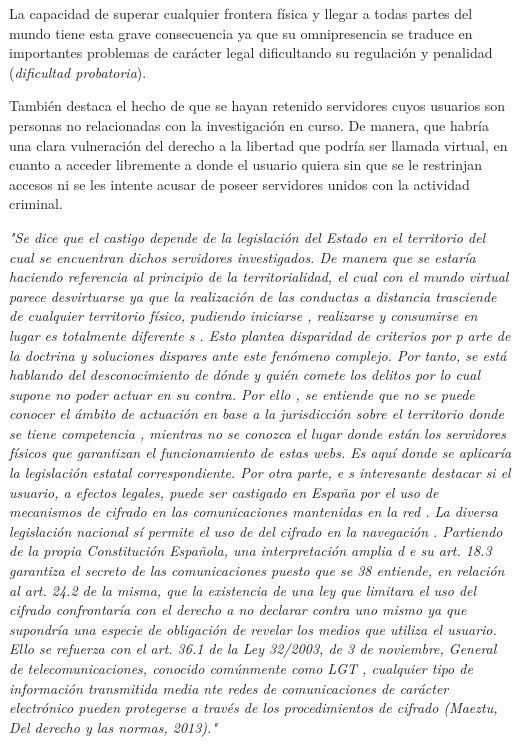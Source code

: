 \documentclass[a4paper, 11pt, titlepage]{article}
\begin{document}
        La capacidad de superar cualquier frontera física y llegar a todas partes del mundo tiene esta grave consecuencia 
        ya que su omnipresencia se traduce en  importantes problemas de carácter legal dificultando su regulación y 
        penalidad (\emph{dificultad  probatoria}).

        También destaca el hecho de que se hayan retenido servidores cuyos usuarios son personas no relacionadas con la 
        investigación en curso. De manera, que habría una clara vulneración del derecho a la libertad que podría ser 
        llamada virtual, en cuanto a acceder libremente a donde el usuario quiera sin que se le restrinjan accesos ni 
        se les intente acusar de poseer servidores unidos con la actividad criminal.

        \emph{"Se dice que el castigo depende de la legislación del Estado en el territorio del cual se  encuentran  
        dichos  servidores  investigados. De  manera  que  se estaría haciendo referencia al principio de la 
        territorialidad, el cual con el mundo virtual parece  desvirtuarse  ya  que  la  realización  de  las  conductas  
        a  distancia  trasciende  de cualquier  territorio  físico,  pudiendo  iniciarse ,  realizarse  y  consumirse  en 
        lugar es totalmente diferente s .  Esto  plantea  disparidad  de  criterios  por  p arte  de  la  doctrina y 
        soluciones  dispares ante  este  fenómeno  complejo. Por tanto, se está hablando del desconocimiento de dónde y 
        quién comete los delitos por lo  cual  supone  no  poder  actuar  en  su  contra.  Por  ello , se  entiende  que  
        no  se  puede conocer  el  ámbito  de  actuación  en  base  a  la  jurisdicción  sobre  el  territorio  donde  
        se tiene competencia , mientras no se conozca el lugar donde están los servidores físicos que  garantizan  el  
        funcionamiento  de  estas  webs. Es  aquí  donde  se  aplicaría  la legislación estatal correspondiente.
        Por otra parte, e s interesante destacar si el usuario, a efectos legales, puede ser castigado en  España por  
        el  uso  de  mecanismos  de  cifrado en  las  comunicaciones mantenidas  en  la  red . La diversa  legislación  
        nacional  sí permite  el  uso  de  del  cifrado en  la  navegación .  Partiendo  de  la  propia  Constitución  
        Española,  una  interpretación amplia  d e  su  art.  18.3  garantiza  el  secreto  de  las  comunicaciones  
        puesto  que  se 38 entiende, en relación al art. 24.2 de la misma, que la existencia de una ley que limitara 
        el uso del cifrado confrontaría con el derecho a no declarar contra uno mismo ya que supondría una especie de 
        obligación de revelar los medios que utiliza el usuario. Ello se  refuerza  con  el art. 36.1 de  la  Ley  32/2003,  
        de  3  de  noviembre,  General  de telecomunicaciones,  conocido  comúnmente  como  LGT , cualquier  tipo  de 
        información transmitida   media nte   redes   de   comunicaciones   de   carácter electrónico pueden protegerse  
        a  través  de  los  procedimientos  de  cifrado (Maeztu, Del derecho y las normas, 2013)."}
\end{document}
